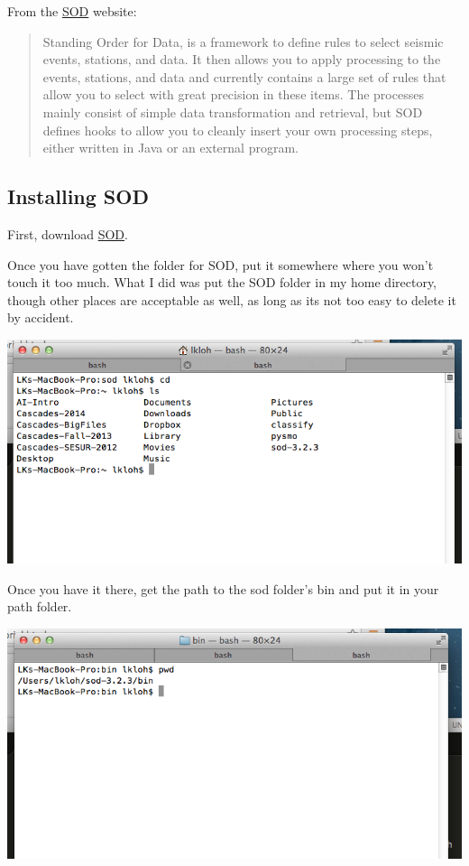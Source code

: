 \documentclass[letterpaper,10pt,english]{sphinxmanual}
\begin{document}
From the \href{http://www.seis.sc.edu/index.html}{SOD} website:
\begin{quote}

Standing Order for Data, is a framework to define rules to select seismic events, stations, and data. It then allows you to apply processing to the events, stations, and data and currently contains a large set of rules that allow you to select with great precision in these items. The processes mainly consist of simple data transformation and retrieval, but SOD defines hooks to allow you to cleanly insert your own processing steps, either written in Java or an external program.
\end{quote}


\subsection{Installing SOD}
\label{docfiles/gettingData:installing-sod}
First, download \href{http://www.seis.sc.edu/index.html}{SOD}.

Once you have gotten the folder for SOD, put it somewhere where you won't touch it too much. What I did was put the SOD folder in my home directory, though other places are acceptable as well, as long as its not too easy to delete it by accident.

\includegraphics{sod_location.png}

Once you have it there, get the path to the sod folder's bin and put it in your path folder.

\includegraphics{path_to_sod_bin.png}
\end{document}
